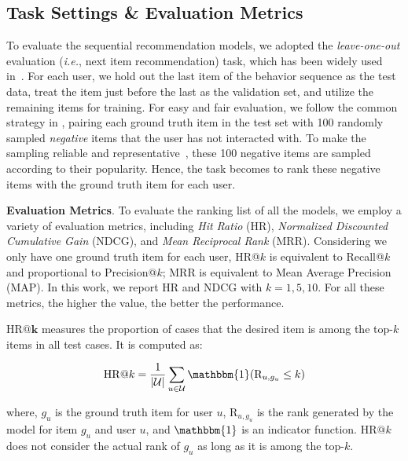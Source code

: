 \subsection{Task Settings \& Evaluation Metrics}

To evaluate the sequential recommendation models, we adopted the \textit{leave-one-out} evaluation (\textit{i.e.}, next item recommendation) task, which has been widely used in~\cite{He:www2017:NCF,Tang:WSDM2018:caser,Kang:ICDM2018:SAS}. For each user, we hold out the last item of the behavior sequence as the test data, treat the item just before the last as the validation set, and utilize the remaining items for training. For easy and fair evaluation, we follow the common strategy in \cite{He:www2017:NCF,Tang:WSDM2018:caser,Kang:ICDM2018:SAS}, pairing each ground truth item in the test set with 100 randomly sampled \textit{negative} items that the user has not interacted with. To make the sampling reliable and representative~\cite{Huang:sigir2018:ISR}, these 100 negative items are sampled according to their popularity. Hence, the task becomes to rank these negative items with the ground truth item for each user.

\textbf{Evaluation Metrics}. To evaluate the ranking list of all the models, we employ a variety of evaluation metrics, including \textit{Hit Ratio} (HR), \textit{Normalized Discounted Cumulative Gain} (NDCG), and \textit{Mean Reciprocal Rank} (MRR). Considering we only have one ground truth item for each user, HR@$k$ is equivalent to Recall@$k$ and proportional to Precision@$k$; MRR is equivalent to Mean Average Precision (MAP). In this work, we report HR and NDCG with $k={1,5,10}$. For all these metrics, the higher the value, the better the performance.

\iffalse
$\bm{\mathrm{HR}@k}$ measures the proportion of cases that the desired item is among the top-$k$ items in all test cases. It is computed as:

\begin{equation*}
    \mathrm{HR}@k = \frac{1}{\vert \mathcal{U} \vert}\sum_{u \in \mathcal{U}} \mathbbm{1}(\mathrm{R}_{u, g_u} \leq k)
\end{equation*}

where, $g_u$ is the ground truth item for user $u$, $\mathrm{R}_{u, g_u}$ is the rank generated by the model for item $g_u$ and user $u$, and $\mathbbm{1}$ is an indicator function.
$\mathrm{HR}@k$ does not consider the actual rank of $g_u$ as long as it is among the top-$k$.

